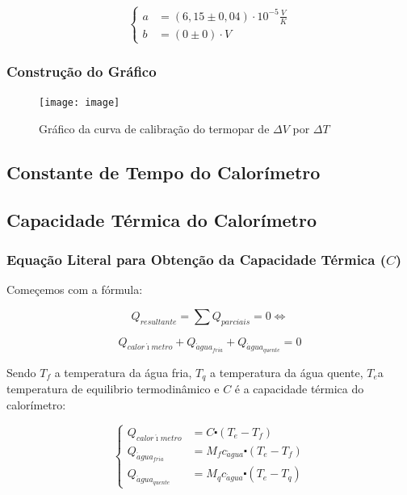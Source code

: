 \documentclass[a4paper]{article}
\begin{document}
			\[
				\begin{cases}
					a & =\left(6,15\pm0,04\right)\cdot10^{-5}\unit{\frac{V}{K}}\\
					b & =\left(0\pm0\right)\cdot\unit{V}
				\end{cases}
			\]

		\subsubsection{Construção do Gráfico}

			\begin{figure}
				\caption{Gráfico da curva de calibração do termopar de $\Delta V$ por $\Delta T$}
					\begin{centering}
						\texttt{[image: image]}
					\par\end{centering}
			\end{figure}

	\subsection{Constante de Tempo do Calorímetro}

	\subsection{Capacidade Térmica do Calorímetro}


		\subsubsection{Equação Literal para Obtenção da Capacidade Térmica ($C$)}

			Começemos com a fórmula:

			\[
				Q_{resultante}={\displaystyle \sum Q_{parciais}=0}\Leftrightarrow
			\]


			\[
				Q_{calor\acute{\imath}metro}+Q_{\acute{a}gua_{fria}}+Q_{\acute{a}gua_{quente}}=0
			\]


			Sendo $T_{f}$ a temperatura da água fria, $T_{q}$ a temperatura
			da água quente, $T_{e}$a temperatura de equilibrio termodinâmico
			e $C$ é a capacidade térmica do calorímetro:

			\[
			\begin{cases}
				Q_{calor\acute{\imath}metro} & =C\centerdot(T_{e}-T_{f})\\
				Q_{\acute{a}gua_{fria}} & =M_{f}c_{\acute{a}gua}\centerdot(T_{e}-T_{f})\\
				Q_{\acute{a}gua_{quente}} & =M_{q}c_{\acute{a}gua}\centerdot(T_{e}-T_{q})
			\end{cases}
			\]
\end{document}
